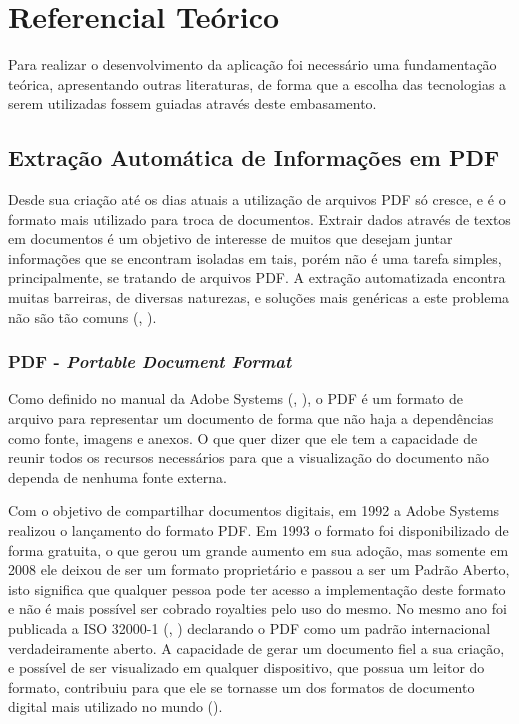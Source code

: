 \chapter{Referencial Teórico}

Para realizar o desenvolvimento da aplicação foi necessário uma fundamentação teórica, apresentando outras literaturas, de forma que a escolha das tecnologias a serem utilizadas fossem guiadas através deste embasamento.

\section{Extração Automática de Informações em PDF}

Desde sua criação até os dias atuais a utilização de arquivos PDF só cresce, e é o formato mais utilizado para troca de documentos.
Extrair dados através de textos em documentos é um objetivo de interesse de muitos que desejam juntar informações que se encontram isoladas em tais, porém não é uma tarefa simples, principalmente, se tratando de arquivos PDF. A extração automatizada encontra muitas barreiras, de diversas naturezas, e soluções mais genéricas a este problema não são tão comuns (\citeauthor{ajedig2011pdf}, \citeyear{ajedig2011pdf}).

\subsection{PDF - \textit{Portable Document Format}}

Como definido no manual da Adobe Systems (\citeauthor{bienz1993portable}, \citeyear{bienz1993portable}), o PDF é um formato de arquivo para representar um documento de forma que não haja a dependências como fonte, imagens e anexos. O que quer dizer que ele tem a capacidade de reunir todos os recursos necessários para que a visualização do documento não dependa de nenhuma fonte externa.

Com o objetivo de compartilhar documentos digitais, em 1992 a Adobe Systems realizou o lançamento do formato PDF. Em 1993 o formato foi disponibilizado de forma gratuita, o que gerou um grande aumento em sua adoção, mas somente em 2008 ele deixou de ser um formato proprietário e passou a ser um Padrão Aberto, isto significa que qualquer pessoa pode ter acesso a implementação deste formato e não é mais possível ser cobrado royalties pelo uso do mesmo. No mesmo ano foi publicada a ISO 32000-1 (\citeauthor{ISO32000}, \citeyear{ISO32000}) declarando o PDF como um padrão internacional verdadeiramente aberto. A capacidade de gerar um documento fiel a sua criação, e possível de ser visualizado em qualquer dispositivo, que possua um leitor do formato, contribuiu para que ele se tornasse um dos formatos de documento digital mais utilizado no mundo (\cite{adobePDF}).

